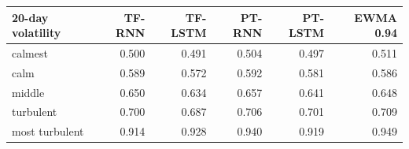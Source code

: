 \begin{tabular}{lrrrrr}
\toprule
20-day volatility & TF-RNN & TF-LSTM & PT-RNN & PT-LSTM & EWMA 0.94 \\
\midrule
calmest & 0.500 & 0.491 & 0.504 & 0.497 & 0.511 \\
calm & 0.589 & 0.572 & 0.592 & 0.581 & 0.586 \\
middle & 0.650 & 0.634 & 0.657 & 0.641 & 0.648 \\
turbulent & 0.700 & 0.687 & 0.706 & 0.701 & 0.709 \\
most turbulent & 0.914 & 0.928 & 0.940 & 0.919 & 0.949 \\
\bottomrule
\end{tabular}